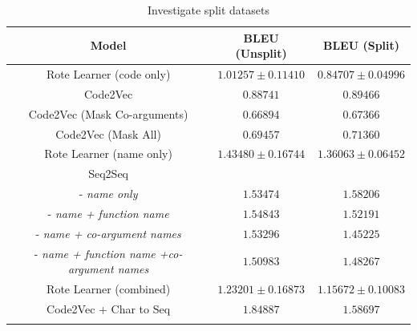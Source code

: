 \begin{table}[!ht]
\begin{center}
\begin{tabular}{ c | c | c }
    Model                             & BLEU (Unsplit)  & BLEU (Split) \\
    \hline
    Rote Learner  (code only)         & $ 1.01257 \pm  0.11410 $ & $ 0.84707 \pm 0.04996 $ \\
    Code2Vec                          & $ 0.88741 $ & $ 0.89466 $ \\
    Code2Vec  (Mask Co-arguments)             & $ 0.66894 $ & $ 0.67366 $ \\
    Code2Vec  (Mask All)             & $ 0.69457 $ & $ 0.71360 $ \\
    \hline
    \hline
    Rote Learner  (name only)         & $ 1.43480 \pm  0.16744 $ & $ 1.36063 \pm 0.06452 $ \\
    \hline
    Seq2Seq                             & &   \\
    - \textit{name only}              & $ 1.53474 $ & $ 1.58206 $ \\
    - \textit{name + function name}      & $ 1.54843 $ & $ 1.52191 $ \\
    - \textit{name + co-argument names}         & $ 1.53296 $ & $ 1.45225 $ \\   
    - \textit{name + function name +co-argument names}     & $ 1.50983 $ & $ 1.48267 $ \\
    \hline
    \hline
    Rote Learner (combined)            & $ 1.23201 \pm  0.16873 $ & $ 1.15672 \pm 0.10083 $ \\
    Code2Vec  + Char to Seq            & $ 1.84887 $ & $ 1.58697 $ \\\\
    \hline
\end{tabular}
\caption {Investigate split datasets}
\label{table:split_datasets_embed}
\end{center}
\end{table}


